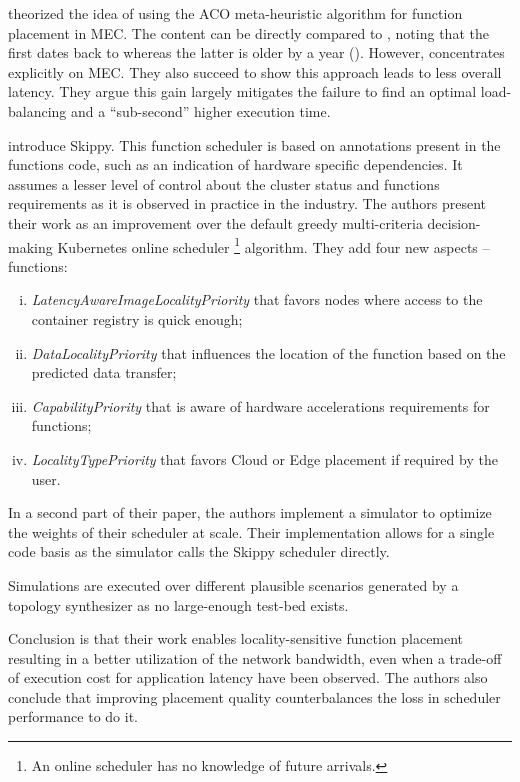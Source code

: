 \documentclass[11pt]{sdm}
\begin{document}
\begin{description}[leftmargin=10pt]
	\item[\citet{palade_swarm-based_2020}] theorized the idea of using the \gls{ACO} meta-heuristic algorithm for function placement in \gls{MEC}. The content can be directly compared to \cite{mutichiro_qos-based_2021}, noting that the first dates back to  whereas the latter is older by a year (). However, \cite{palade_swarm-based_2020} concentrates explicitly on \gls{MEC}. They also succeed to show this approach leads to less overall latency. They argue this gain largely mitigates the failure to find an optimal load-balancing and a ``sub-second'' higher execution time.

	\item[\citet{rausch_optimized_2021}] introduce Skippy. This function scheduler is based on annotations present in the functions code, such as an indication of hardware specific dependencies. It assumes a lesser level of control about the cluster status and functions requirements as it is observed in practice in the industry. The authors present their work as an improvement over the default greedy multi-criteria decision-making Kubernetes online scheduler \footnote{An online scheduler has no knowledge of future arrivals.} algorithm. They add four new aspects -- functions:
		\begin{enumerate}[(i)]
			\item \emph{LatencyAwareImageLocalityPriority} that favors nodes where access to the container registry is quick enough;
			\item \emph{DataLocalityPriority} that influences the location of the function based on the predicted data transfer;
			\item \emph{CapabilityPriority} that is aware of hardware accelerations requirements for functions;
			\item \emph{LocalityTypePriority} that favors Cloud or Edge placement if required by the user.
		\end{enumerate}

		In a second part of their paper, the authors implement a simulator to optimize the weights of their scheduler at scale. Their implementation allows for a single code basis as the simulator calls the Skippy scheduler directly.

		Simulations are executed over different plausible scenarios generated by a topology synthesizer as no large-enough test-bed exists.

		Conclusion is that their work enables locality-sensitive function placement resulting in a better utilization of the network bandwidth, even when a trade-off of execution cost for application latency have been observed. The authors also conclude that improving placement quality counterbalances the loss in scheduler performance to do it.


\end{description}
\end{document}
